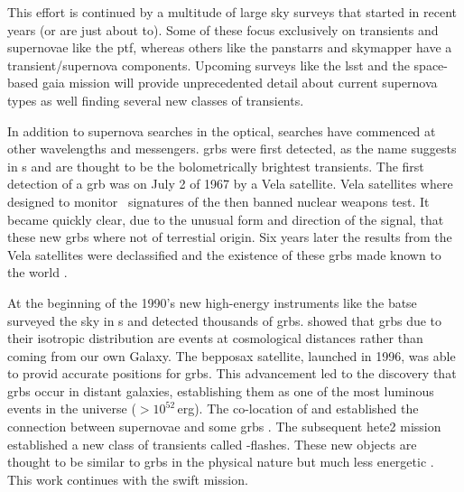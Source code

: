 This effort is continued by a multitude of large sky surveys that started in recent years (or are just about to). Some of these focus exclusively on transients and supernovae like the \gls{ptf}, whereas others like the \gls{panstarrs} and \gls{skymapper} have a transient/supernova components. Upcoming surveys like the \gls{lsst} and the space-based \gls{gaia} mission will provide unprecedented detail about current supernova types as well finding several new classes of transients.

In addition to supernova searches in the optical, searches have commenced at other wavelengths and messengers. \glspl{grb} were first detected, as the name suggests in \gammaray s and are thought to be the bolometrically brightest  transients. The first detection of a \gls{grb} was on July 2 of 1967 by a Vela satellite. Vela satellites where designed to monitor \gammaray\ signatures of the then banned nuclear weapons test. It became quickly clear, due to the unusual form and direction of the signal, that these new \glspl{grb} where not of terrestial origin. Six years later the results from the Vela satellites were declassified and the existence of these \glspl{grb} made known to the world \citep{1973ApJ...182L..85K}. 


At the beginning of the 1990's new high-energy instruments like the \gls{batse} surveyed the sky in \gammaray s and detected thousands of \glspl{grb}. \citet{1992Natur.355..143M} showed that \glspl{grb} due to their isotropic distribution are events at cosmological distances rather than coming from our own Galaxy. The \gls{bepposax} satellite, launched in 1996, was able to provid accurate positions for \glspl{grb}. This advancement led to the discovery that \glspl{grb} occur in distant galaxies, establishing them as one of the most luminous events in the universe ($>10^{52}$\,erg). The co-location of  and  established the connection between supernovae and some \glspl{grb} \citep{1998Natur.395..670G}. The subsequent \gls{hete2} mission established a new class of transients called \xray-flashes. These new objects are thought to be similar to  \glspl{grb} in the physical nature but much less energetic \citep{2004ApJ...601L.119Z}. This work continues with the \gls{swift} mission. 

